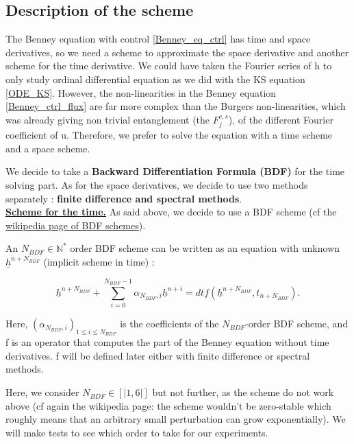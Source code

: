 \documentclass[12pt]{article}
\begin{document}
\subsection{Description of the scheme}

The Benney equation with control \eqref{Benney_eq_ctrl} has time and space derivatives, so we need a scheme to approximate 
the space derivative and another scheme for the time derivative. We could have taken the Fourier series of h to only study 
ordinal differential equation as we did with the KS equation \eqref{ODE_KS}. However, the non-linearities in the Benney 
equation \eqref{Benney_ctrl_flux} are far more complex than the Burgers non-linearities, which was already giving non 
trivial entanglement (the $F_j^{c,s}$), of the different Fourier coefficient of u. Therefore, we prefer to 
solve the equation with a time scheme and a space scheme. 

We decide to take a \textbf{Backward Differentiation Formula (BDF)} for the time solving part. As for the space derivatives, we decide 
to use two methods separately : \textbf{finite difference and spectral methods}. 
\\

\underline{\textbf{Scheme for the time.}}
As said above, we decide to use a BDF scheme (cf the \href{https://en.wikipedia.org/wiki/Backward_differentiation_formula}{wikipedia page of BDF schemes}).

An $N_{BDF}\in \mathbb{N}^*$ order BDF scheme can be written as an equation with unknown $\underline{h}^{n+N_{BDF}}$ (implicit scheme in time) :

\begin{equation}\label{eq:BDF_scheme}
    \underline{h}^{n+N_{BDF}} + \sum_{i=0}^{N_{BDF}-1} \alpha_{N_{BDF}, i}\underline{h}^{n+i} = dtf(\underline{h}^{n+N_{BDF}}, t_{n+N_{BDF}}).
\end{equation}

Here, $(\alpha_{N_{BDF},i})_{1\leq i \leq N_{BDF}}$ is the coefficients of the $N_{BDF}$-order BDF scheme, and f is an operator that computes the part of the 
Benney equation without time derivatives. f will be defined later either with finite difference or spectral methods.

Here, we consider $N_{BDF}\in [|1,6|]$ but not further, as the scheme do not work above (cf again the wikipedia page: the scheme
 wouldn't be zero-stable which roughly means that an arbitrary small perturbation can grow exponentially). We will make tests to see which order to take for our experiments.
\\
\end{document}
